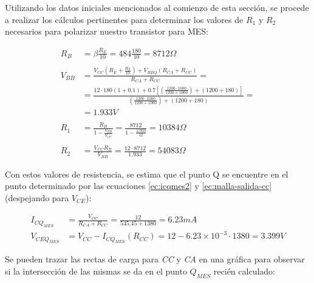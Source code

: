 Utilizando los datos iniciales mencionados al comienzo de esta sección, se procede
a realizar los cálculos pertinentes para determinar los valores de $R_1$ y $R_2$ necesarios
para polarizar nuestro transistor para MES:

\begin{align*}
    R_B &= \beta \frac{R_E}{10} = 484\frac{180}{10} = \boxed{8712\Omega}\\ \\
    V_{BB} &= \frac{V_{CC}(R_E +\frac{R_E}{10}) + V_{BEQ}(R_{CA}+R_{CC})}{R_{CA}+R_{CC}} = \\
    &= \frac{12 \cdot 180(1+0.1) + 0.7[(\frac{1200\cdot1000}{1200+1000})+(1200+180)]}{(\frac{1200\cdot1000}{1200+1000})+(1200+180)} = \\
    &= \boxed{1.933V}\\ \\
    R_1 &= \frac{R_B}{1-\frac{V_{BB}}{V_{CC}}} = \frac{8712}{1-\frac{1.933}{12}} = \boxed{10384\Omega}\\ \\
    R_2 &= \frac{V_{CC}R_B}{V_{BB}} = \frac{12\cdot8712}{1.933} = \boxed{54083\Omega}
\end{align*}

Con estos valores de resistencia, se estima que el punto Q se encuentre en el punto
determinado por las ecuaciones \ref{ec:icqmes2} y \ref{ec:malla-salida-cc} (despejando
para $V_{CE}$):

\begin{align*}
    I_{CQ_{MES}} &= \frac{V_{CC}}{R_{CA} + R_{CC}} = \frac{12}{545.45+1380} = \boxed{6.23mA}\\
    V_{CEQ_{MES}} &= V_{CC} - I_{CQ_{MES}}(R_{CC}) = 12-6.23\times10^{-3} \cdot 1380 = \boxed{3.399V}
\end{align*}

Se pueden trazar las rectas de carga para \emph{CC} y \emph{CA} en una gráfica para
observar si la intersección de las mismas se da en el punto $Q_{MES}$ recién calculado:

\begin{figure}[!ht]
  \centering
  \begin{minipage}{0.45\textwidth}
  \end{minipage}
\end{figure}

